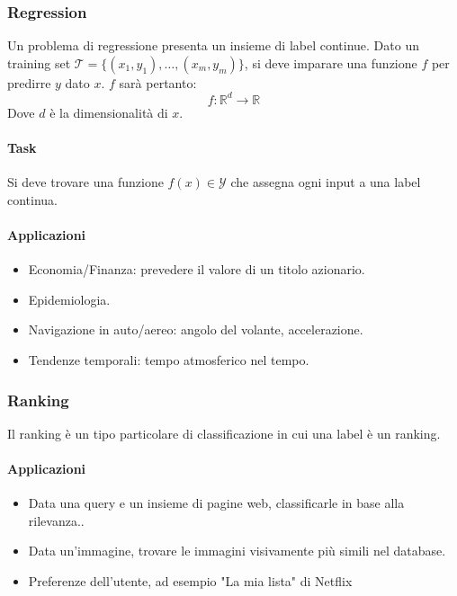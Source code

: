 \subsubsection{Regression}
Un problema di regressione presenta un insieme di label continue.
Dato un training set $\mathcal{T}=\{(x_1, y_1),\dots,(x_m,y_m)\}$, si deve imparare una funzione $f$ per predirre $y$ dato $x$.
$f$ sar\`a pertanto:
$$f:\mathbb{R}^d\rightarrow\mathbb{R}$$
Dove $d$ \`e la dimensionalit\`a di $x$.

\paragraph{Task}
Si deve trovare una funzione $f(x)\in\mathcal{Y}$ che assegna ogni input a una label continua.
\paragraph{Applicazioni}
\begin{multicols}{2}
	\begin{itemize}
		\item Economia/Finanza: prevedere il valore di un titolo azionario.
		\item Epidemiologia.
		\item Navigazione in auto/aereo: angolo del volante, accelerazione.
		\item Tendenze temporali: tempo atmosferico nel tempo.
	\end{itemize}
\end{multicols}
\subsubsection{Ranking}
Il ranking \`e un tipo particolare di classificazione in cui una label \`e un ranking.

\paragraph{Applicazioni}
\begin{multicols}{2}
	\begin{itemize}
		\item Data una query e un insieme di pagine web, classificarle in base alla rilevanza..
		\item Data un'immagine, trovare le immagini visivamente più simili nel database.
		\item Preferenze dell'utente, ad esempio "La mia lista" di Netflix 
	\end{itemize}
\end{multicols}

